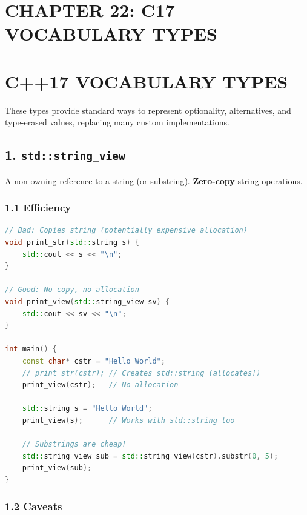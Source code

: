 \hypertarget{chapter-22-c17-vocabulary-types}{%
\section{CHAPTER 22: C17 VOCABULARY
TYPES}\label{chapter-22-c17-vocabulary-types}}

\hypertarget{c17-vocabulary-types}{%
\section{C++17 VOCABULARY TYPES}\label{c17-vocabulary-types}}

These types provide standard ways to represent optionality,
alternatives, and type-erased values, replacing many custom
implementations.

\hypertarget{stdstring_view}{%
\subsection{\texorpdfstring{1.
\texttt{std::string\_view}}{1. std::string\_view}}\label{stdstring_view}}

A non-owning reference to a string (or substring). \textbf{Zero-copy}
string operations.

\hypertarget{efficiency}{%
\subsubsection{1.1 Efficiency}\label{efficiency}}

\begin{lstlisting}[language={C++}]
// Bad: Copies string (potentially expensive allocation)
void print_str(std::string s) {
    std::cout << s << "\n";
}

// Good: No copy, no allocation
void print_view(std::string_view sv) {
    std::cout << sv << "\n";
}

int main() {
    const char* cstr = "Hello World";
    // print_str(cstr); // Creates std::string (allocates!)
    print_view(cstr);   // No allocation

    std::string s = "Hello World";
    print_view(s);      // Works with std::string too

    // Substrings are cheap!
    std::string_view sub = std::string_view(cstr).substr(0, 5);
    print_view(sub);
}
\end{lstlisting}

\hypertarget{caveats}{%
\subsubsection{1.2 Caveats}\label{caveats}}

